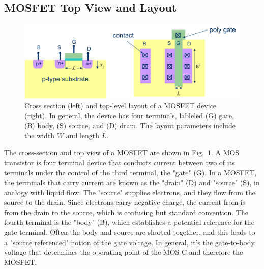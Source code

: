 \subsection{MOSFET Top View and Layout}
\begin{figure}[tb]
\centering
\includegraphics[width=.95\columnwidth]{mosfet_layout}
\caption{Cross section (left) and top-level layout of a MOSFET device (right).  In general, the device has four terminals, lableled (G) gate, (B) body, (S) source, and (D) drain.  The layout parameters include the width $W$ and length $L$.}
\label{fig:mosfet_layout}
\end{figure}
The cross-section and top view of a MOSFET are shown in Fig.~\ref{fig:mosfet_layout}.  A MOS transistor is four terminal device that conducts current between two of its terminals under the control of the third terminal, the "gate" (G).  In a MOSFET, the terminals that carry current are known as the "drain" (D) and "source" (S), in analogy with liquid flow.  The "source" supplies electrons, and they flow from the source to the drain.  Since electrons carry negative charge, the current from is from the drain to the source, which is confusing but standard convention.  The fourth terminal is the "body" (B), which establishes a potential reference for the gate terminal.  Often the body and source are shorted together, and this leads to a "source referenced" notion of the gate voltage.  In general, it's the gate-to-body voltage that determines the operating point of the MOS-C and therefore the MOSFET.
